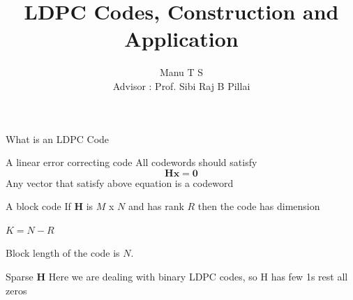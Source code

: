 \documentclass{beamer}
\title[]{LDPC Codes, Construction and Application}
\author[Manu T S]{Manu T S \\ {\footnotesize Advisor : Prof. Sibi Raj B Pillai}}
\institute[IITB]{IIT Bombay}
\begin{document}
  \frame{\titlepage}

    \begin{frame}{What is an LDPC Code}
    \begin{block}{A linear error correcting code}
      All codewords should satisfy
      \begin{equation}
       \mathbf{Hx} = \mathbf{0}
      \end{equation}
      Any vector that satisfy above equation is a codeword
    \end{block}
    \begin{block}{A block code}
      If \textbf{H} is $M$ x $N$ and has rank $R$ then the code has dimension
      \begin{center}
	$K = N - R$
      \end{center}
      Block length of the code is $N$.
    \end{block}
    \begin{block}{Sparse \textbf{H}}
      Here we are dealing with binary LDPC codes, so H has few 1s rest all zeros
    \end{block}
  \end{frame}
%   
\end{document}
